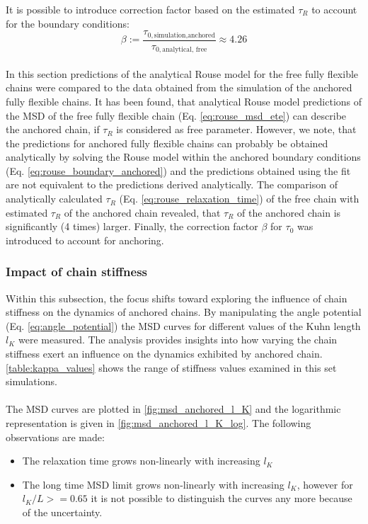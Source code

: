 \documentclass[
    paper=A4,pagesize=automedia,fontsize=12pt,
    BCOR=15mm,DIV=22,
    twoside,headinclude,footinclude=false,
    fleqn,             %
    bibliography=totocnumbered,          %
    listof=totoc,                %
    listof=flat,                 %
    cleardoublepage=empty      %
    numbers=endperiod
]{scrartcl}
\begin{document}
It is possible to introduce correction factor based on the estimated $\tau_R$
to account for the boundary conditions:
\begin{equation}
    \label{eq:adj_factor_beta}
    \beta := \frac{\tau_{0, \textrm{simulation,anchored}}}{\tau_{0, \textrm{analytical, free}}} \approx 4.26
\end{equation}
\\
In this section predictions of the analytical Rouse model for 
the free fully flexible chains were compared to the data obtained 
from the simulation of the anchored fully flexible chains.
It has been found, that analytical Rouse model predictions of the MSD of the 
free fully flexible chain (Eq. \ref{eq:rouse_msd_ete}) can describe the 
anchored chain, if $\tau_R$ is considered as free parameter. However, we note,
that the predictions for anchored fully flexible chains can probably 
be obtained analytically by solving the Rouse model within the anchored boundary conditions 
(Eq. \ref{eq:rouse_boundary_anchored}) and the predictions obtained using the 
fit are not equivalent to the predictions derived analytically.
The comparison of 
analytically calculated $\tau_R$ (Eq. \ref{eq:rouse_relaxation_time}) of the free chain
with estimated $\tau_R$ of the anchored chain revealed, that 
$\tau_R$ of the anchored chain is significantly (4 times) larger. Finally, the
correction factor $\beta$ for $\tau_0$ was introduced to account for anchoring.

\FloatBarrier


\subsubsection{Impact of chain stiffness} \label{sec:impact_of_chain_stiffness}
Within this subsection, the focus shifts 
toward exploring the influence of chain stiffness on
the dynamics of anchored chains. 
By manipulating the angle potential (Eq. \ref{eq:angle_potential})
the MSD curves for different values
of the Kuhn length $l_K$ were measured. 
The analysis provides insights into 
how varying the chain stiffness exert an influence on the 
dynamics exhibited by anchored chain.
\autoref{table:kappa_values} shows the range of stiffness values examined
in this set simulations.
\\
\\
The MSD curves are plotted in \autoref{fig:msd_anchored_l_K} and the logarithmic
representation is given in \autoref{fig:msd_anchored_l_K_log}.
The following observations are made:
\begin{itemize}
    \item The relaxation time grows non-linearly with increasing $l_K$
    \item The long time MSD limit grows non-linearly with increasing $l_K$,
    however for $l_K/L >= 0.65$ it is not possible to distinguish 
    the curves any more because of the uncertainty.
\end{itemize}
\end{document}
